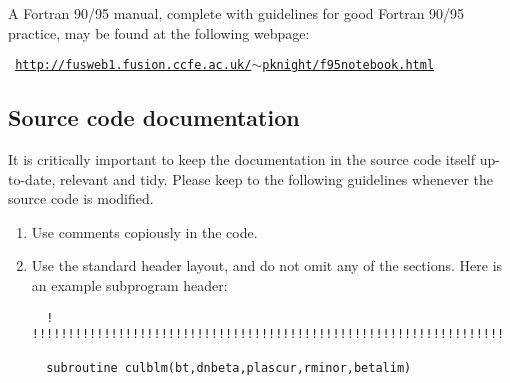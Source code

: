 A Fortran 90/95 manual, complete with guidelines for good Fortran 90/95
practice, may be found at the following webpage:
\begin{center}
\texttt{
\href{http://fusweb1.fusion.ccfe.ac.uk/~pknight/f95notebook.html}
{http://fusweb1.fusion.ccfe.ac.uk/$\sim$pknight/f95notebook.html}
}
\end{center}

\subsection{Source code documentation}

It is critically important to keep the documentation in the source code itself
up-to-date, relevant and tidy. Please keep to the following guidelines
whenever the source code is modified.
\begin{enumerate}

\item Use comments copiously in the code.

\item Use the standard header layout, and do not omit any of the
  sections. Here is an example subprogram header:
\footnotesize
\begin{verbatim}
  ! !!!!!!!!!!!!!!!!!!!!!!!!!!!!!!!!!!!!!!!!!!!!!!!!!!!!!!!!!!!!!!!!!!

  subroutine culblm(bt,dnbeta,plascur,rminor,betalim)


\end{verbatim}
\end{enumerate}
